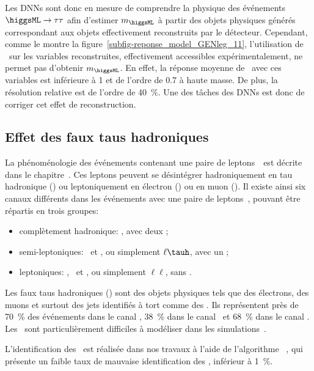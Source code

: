 \par
Les DNNs sont donc en mesure
de comprendre la physique des événements $\higgsML\to\tau\tau$
afin d'estimer $m_{\higgsML}$
à partir des objets physiques générés
correspondant aux objets effectivement reconstruits par le détecteur.
Cependant, comme le montre la figure~\ref{subfig-reponse_model_GENleg_11},
l'utilisation de \Bgenleg\ sur les variables reconstruites, effectivement accessibles expérimentalement, ne permet pas d'obtenir $m_{\higgsML}$.
En effet, la réponse moyenne de \Bgenleg\ avec ces variables est inférieure à \num{1} et de l'ordre de \num{0.7} à haute masse.
De plus, la résolution relative est de l'ordre de \SI{40}{\%}.
Une des tâches des DNNs est donc de corriger cet effet de reconstruction.
\subsection{Effet des faux taus hadroniques}
La phénoménologie des événements contenant une paire de leptons~\tau\ est décrite dans le chapitre~.
Ces leptons peuvent se désintégrer hadroniquement en tau hadronique (\tauh) ou leptoniquement en électron (\ele) ou en muon (\mu).
Il existe ainsi six canaux différents dans les événements avec une paire de leptons~\tau, pouvant être répartis en trois groupes:
\begin{itemize}
\item complètement hadronique: \tauh\tauh, avec deux \tauh;
\item semi-leptoniques: \mu\tauh\ et \ele\tauh, ou simplement $\ell\tauh$, avec un \tauh;
\item leptoniques: \mu\mu, \ele\mu\ et \ele\ele, ou simplement $\ell\ell$, sans \tauh.
\end{itemize}
\par
Les faux taus hadroniques (\ftauhs) sont des objets physiques tels que des électrons, des muons et surtout des jets identifiés à tort comme des \tauh.
Ils représentent près de \SI{70}{\%} des événements dans le canal \tauh\tauh, \SI{38}{\%} dans le canal \mu\tauh\ et \SI{68}{\%} dans le canal \ele\tauh.
Les \ftauhs\ sont particulièrement difficiles à modéliser dans les simulations~\cite{CMS-NOTE-2018-257,CMS-NOTE-2019-170}.
\par
L'identification des \tauh\ est réalisée dans nos travaux à l'aide de l'algorithme \DEEPTAU~\cite{CMS-DP-2019-033},
qui présente un faible taux de mauvaise identification des \tauh, inférieur à \SI{1}{\%}.
